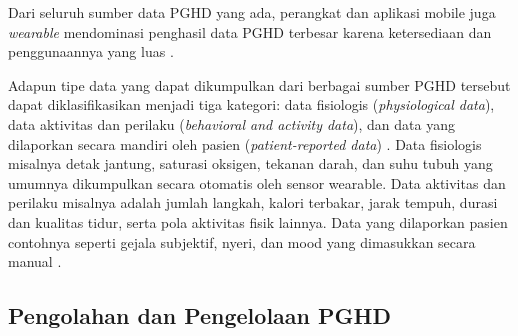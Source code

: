 Dari seluruh sumber data PGHD yang ada, perangkat dan aplikasi mobile juga \textit{wearable} mendominasi penghasil data PGHD terbesar karena ketersediaan dan penggunaannya yang luas \parencite{Omoloja_Vundavalli_2021_PGHD_Benefits_Challenges}.

Adapun tipe data yang dapat dikumpulkan dari berbagai sumber PGHD tersebut dapat diklasifikasikan menjadi tiga kategori: data fisiologis (\textit{physiological data}), data aktivitas dan perilaku (\textit{behavioral and activity data}), dan data yang dilaporkan secara mandiri oleh pasien (\textit{patient-reported data}) \parencite{Cohen_Keller_Hayes_Dorr_Ash_Sittig_2016_PGHD_Integration_EHR,Khatiwada_Yang_Lin_Blobel_2024_PGHD_Understanding}.
Data fisiologis misalnya detak jantung, saturasi oksigen, tekanan darah, dan suhu tubuh yang umumnya dikumpulkan secara otomatis oleh sensor wearable.
Data aktivitas dan perilaku misalnya adalah jumlah langkah, kalori terbakar, jarak tempuh, durasi dan kualitas tidur, serta pola aktivitas fisik lainnya.
Data yang dilaporkan pasien contohnya seperti gejala subjektif, nyeri, dan mood yang dimasukkan secara manual \parencite{Cohen_Keller_Hayes_Dorr_Ash_Sittig_2016_PGHD_Integration_EHR,Khatiwada_Yang_Lin_Blobel_2024_PGHD_Understanding}.

\subsection{Pengolahan dan Pengelolaan PGHD}\label{studi-pengolahan-pengelolaan-pghd}

